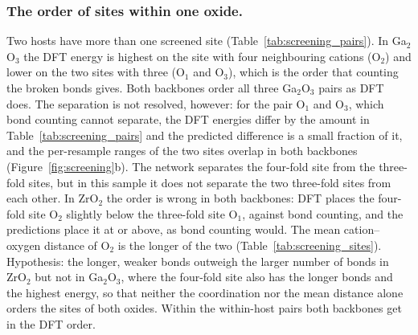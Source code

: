 \subsubsection{The order of sites within one oxide.}
Two hosts have more than one screened site (Table~\ref{tab:screening_pairs}). In Ga$_2$O$_3$ the DFT energy is highest on the site with four neighbouring cations (O$_2$) and lower on the two sites with three (O$_1$ and O$_3$), which is the order that counting the broken bonds gives. Both backbones order all three Ga$_2$O$_3$ pairs as DFT does. The separation is not resolved, however: for the pair O$_1$ and O$_3$, which bond counting cannot separate, the DFT energies differ by the amount in Table~\ref{tab:screening_pairs} and the predicted difference is a small fraction of it, and the per-resample ranges of the two sites overlap in both backbones (Figure~\ref{fig:screening}b). The network separates the four-fold site from the three-fold sites, but in this sample it does not separate the two three-fold sites from each other. In ZrO$_2$ the order is wrong in both backbones: DFT places the four-fold site O$_2$ slightly below the three-fold site O$_1$, against bond counting, and the predictions place it at or above, as bond counting would. The mean cation--oxygen distance of O$_2$ is the longer of the two (Table~\ref{tab:screening_sites}). Hypothesis: the longer, weaker bonds outweigh the larger number of bonds in ZrO$_2$ but not in Ga$_2$O$_3$, where the four-fold site also has the longer bonds and the highest energy, so that neither the coordination nor the mean distance alone orders the sites of both oxides. Within the \numScreeningDemoSummaryVTwoWithinHostPairs{} within-host pairs both backbones get \numScreeningDemoSummaryVTwoWithinHostPairsConcordant{} in the DFT order.

